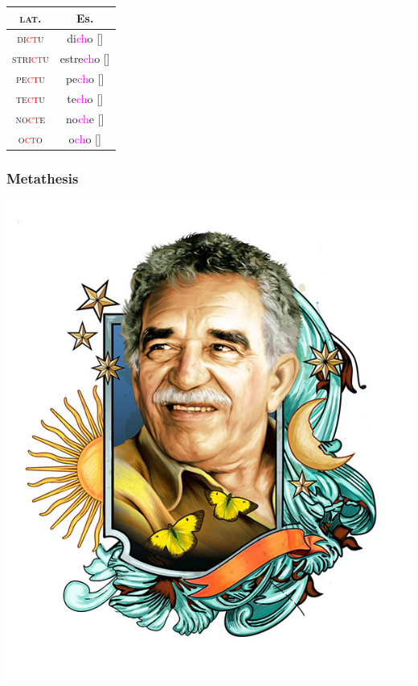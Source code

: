 \documentclass{report}[12pt]
\begin{document}
\begin{tcolorbox}

\end{tcolorbox}

\begin{tabular}{c c}
  \textsc{lat.} & Es. \\
  \hline
  \textsc{di\textcolor{red}{ct}u} & di\textcolor{magenta}{ch}o [\textipa{\textteshlig}] \\
  \textsc{stri\textcolor{red}{ct}u} & estre\textcolor{magenta}{ch}o [\textipa{\textteshlig}] \\
  \textsc{pe\textcolor{red}{ct}u} & pe\textcolor{magenta}{ch}o [\textipa{\textteshlig}] \\
  \textsc{te\textcolor{red}{ct}u} & te\textcolor{magenta}{ch}o [\textipa{\textteshlig}] \\
  \textsc{no\textcolor{red}{ct}e} & no\textcolor{magenta}{ch}e [\textipa{\textteshlig}] \\
  \textsc{o\textcolor{red}{ct}o} & o\textcolor{magenta}{ch}o [\textipa{\textteshlig}] \\
\end{tabular}

\subsubsection{Metathesis}

\begin{tcolorbox}

\end{tcolorbox}

\pagebreak

\includegraphics[scale=0.75]{marquez.jpg}
\end{document}
